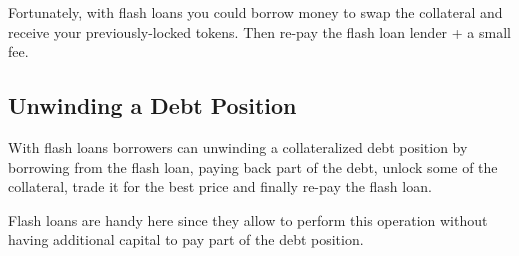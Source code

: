 \documentclass[twocolumn]{article}
\begin{document}
Fortunately, with flash loans you could borrow money to swap the collateral and receive your previously-locked tokens. Then re-pay the flash loan lender + a small fee.


\subsection{Unwinding a Debt Position}
With flash loans borrowers can unwinding a collateralized debt position by borrowing from the flash loan, paying back part of the debt, unlock some of the collateral, trade it for the best price and finally re-pay the flash loan.

Flash loans are handy here since they allow to perform this operation without having additional capital to pay part of the debt position.
\end{document}
